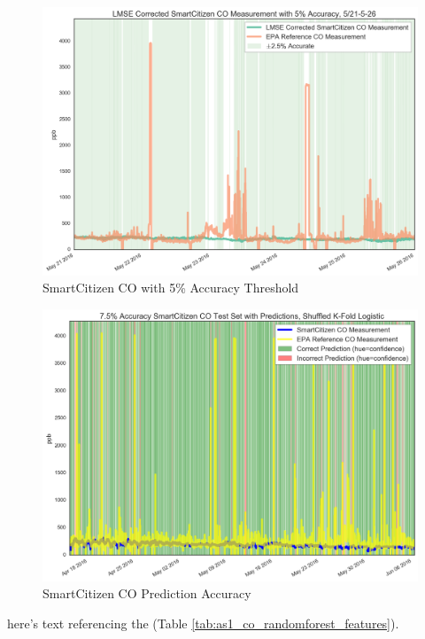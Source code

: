\begin{figure}[htb]
 	\includegraphics[width=\textwidth]{figs/sck_co_with_5_accuracy_zoomed}               
 	 \caption{SmartCitizen CO with 5\% Accuracy Threshold}
  	\label{fig:sck_co_with_5_accuracy_zoomed}
\end{figure}

\begin{figure}[htb]
 	\includegraphics[width=\textwidth]{figs/sck_co_7p5_logistic_predictions}               
 	 \caption{SmartCitizen CO Prediction Accuracy}
  	\label{fig:sck_co_7p5_logistic_predictions}
\end{figure}

here's text referencing the (Table \ref{tab:as1_co_randomforest_features}).

